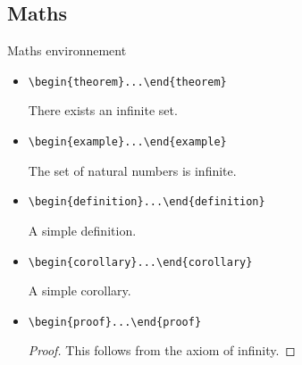 \documentclass[10pt,aspectratio=169,english]{beamer}
\begin{document}
\begin{frame}
\sectionpage
\end{frame}

\subsection{Maths}

\begin{frame}{Maths environnement}
  \begin{itemize}
  \item \lstinline+\begin{theorem}+\lstinline+...\end{theorem}+
    \begin{theorem}
      There exists an infinite set.
    \end{theorem}
  \item \lstinline+\begin{example}...\end{example}+
    \begin{example}
      The set of natural numbers is infinite.
    \end{example}
  \item \lstinline+\begin{definition}+\lstinline+...\end{definition}+\label{sl:definition}
    \begin{definition}
      A simple definition.
    \end{definition}
    \framebreak
  \item \lstinline+\begin{corollary}+\lstinline+...\end{corollary}+
    \begin{corollary}
      A simple corollary.
    \end{corollary}
  \item \lstinline+\begin{proof}...\end{proof}+
    \begin{proof}
      This follows from the axiom of infinity.
    \end{proof}
  \end{itemize}
\end{frame}
\end{document}
